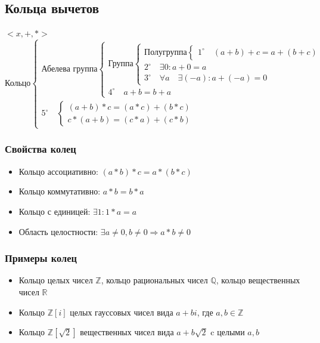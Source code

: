 \documentclass[12pt]{article}
\begin{document}
\subsection{Кольца вычетов}
$<x,+,*>$
\begin{equation*}
    \text{Кольцо}
    \begin{cases}
        \text{Абелева группа}
        \begin{cases}
            \text{Группа}
            \begin{cases}
                \text{Полугруппа}
                \begin{cases}
                    1^{\circ} \quad (a+b)+c = a+(b+c)
                \end{cases}
                \\
                2^{\circ} \quad \exists 0: a+0 = a
                \\
                3^{\circ} \quad \forall a \quad\exists (-a): a + (-a) = 0
            \end{cases}
            \\
            4^{\circ} \quad a + b = b + a
        \end{cases}
        \\
        5^{\circ} \quad \begin{cases}
                            (a+b)*c = (a*c) + (b*c)
                            \\
                            c*(a+b) = (c*a) + (c*b)
                        \end{cases}
    \end{cases}
\end{equation*}

\subsubsection{Свойства колец}
\begin{itemize}
    \item Кольцо ассоциативно: $(a*b)*c = a*(b*c)$
    \item Кольцо коммутативно: $a*b = b*a$
    \item Кольцо с единицей: $\exists 1: 1*a = a$
    \item Область целостности: $\exists a\ne 0, b \ne 0 \Rightarrow a*b \ne 0$
\end{itemize}

\subsubsection{Примеры колец}
\begin{itemize}
    \item Кольцо целых чисел $\mathbb{Z}$, кольцо рациональных чисел $\mathbb{Q}$, кольцо вещественных чисел $\mathbb{R}$
    \item Кольцо $\mathbb{Z}[i]$ целых гауссовых чисел вида $a + bi$, где $a,b \in \mathbb{Z}$
    \item Кольцо $\mathbb{Z}[\sqrt{2}]$ вещественных чисел вида $a + b\sqrt{2}$ c целыми $a,b$
\end{itemize}
\end{document}
